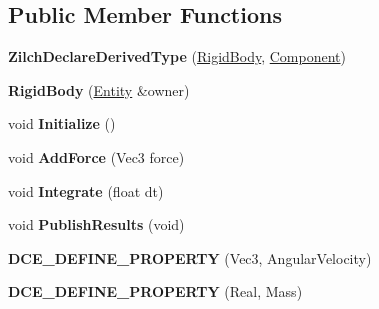 \subsection*{Public Member Functions}
\begin{DoxyCompactItemize}
\item 
\hypertarget{classDCEngine_1_1Components_1_1RigidBody_aa4d0635fd97f98b84459757625861300}{{\bfseries Zilch\-Declare\-Derived\-Type} (\hyperlink{classDCEngine_1_1Components_1_1RigidBody}{Rigid\-Body}, \hyperlink{classDCEngine_1_1Component}{Component})}\label{classDCEngine_1_1Components_1_1RigidBody_aa4d0635fd97f98b84459757625861300}

\item 
\hypertarget{classDCEngine_1_1Components_1_1RigidBody_a1501166452b44eca3b04b163af554e63}{{\bfseries Rigid\-Body} (\hyperlink{classDCEngine_1_1Entity}{Entity} \&owner)}\label{classDCEngine_1_1Components_1_1RigidBody_a1501166452b44eca3b04b163af554e63}

\item 
\hypertarget{classDCEngine_1_1Components_1_1RigidBody_a3a20b663b0f070751f7f7d408fc18e32}{void {\bfseries Initialize} ()}\label{classDCEngine_1_1Components_1_1RigidBody_a3a20b663b0f070751f7f7d408fc18e32}

\item 
\hypertarget{classDCEngine_1_1Components_1_1RigidBody_a5a0946145aa2a51a3261f2eb05d5701e}{void {\bfseries Add\-Force} (Vec3 force)}\label{classDCEngine_1_1Components_1_1RigidBody_a5a0946145aa2a51a3261f2eb05d5701e}

\item 
\hypertarget{classDCEngine_1_1Components_1_1RigidBody_aaeb86c01ac108c29ef41504dfa274017}{void {\bfseries Integrate} (float dt)}\label{classDCEngine_1_1Components_1_1RigidBody_aaeb86c01ac108c29ef41504dfa274017}

\item 
\hypertarget{classDCEngine_1_1Components_1_1RigidBody_a20daebc73879a2e54cbb37164a870c3f}{void {\bfseries Publish\-Results} (void)}\label{classDCEngine_1_1Components_1_1RigidBody_a20daebc73879a2e54cbb37164a870c3f}

\item 
\hypertarget{classDCEngine_1_1Components_1_1RigidBody_a5828b5731a03dd80e617074be171437f}{{\bfseries D\-C\-E\-\_\-\-D\-E\-F\-I\-N\-E\-\_\-\-P\-R\-O\-P\-E\-R\-T\-Y} (Vec3, Angular\-Velocity)}\label{classDCEngine_1_1Components_1_1RigidBody_a5828b5731a03dd80e617074be171437f}

\item 
\hypertarget{classDCEngine_1_1Components_1_1RigidBody_a5fbadbb59d403eccc9cc3ad71e0846a1}{{\bfseries D\-C\-E\-\_\-\-D\-E\-F\-I\-N\-E\-\_\-\-P\-R\-O\-P\-E\-R\-T\-Y} (Real, Mass)}\label{classDCEngine_1_1Components_1_1RigidBody_a5fbadbb59d403eccc9cc3ad71e0846a1}


\end{DoxyCompactItemize}
